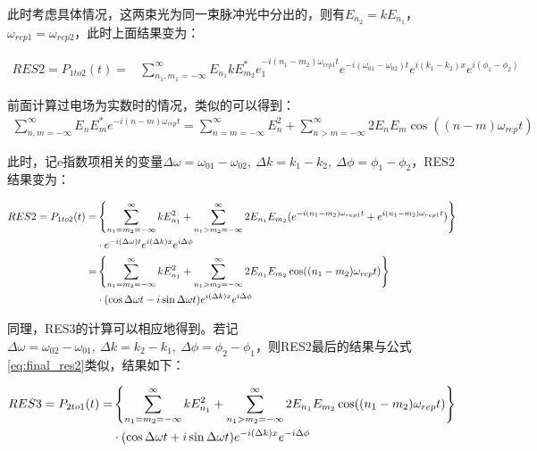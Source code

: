 此时考虑具体情况，这两束光为同一束脉冲光中分出的，则有$E_{n_2}=kE_{n_1}$，$\omega_{rep1}=\omega_{rep2}$，此时上面结果变为：
\begin{footnotesize}
\begin{align}
    RES2=P_{1to2}(t)=&\sum_{n_1,m_1=-\infty}^{\infty}E_{n_1}kE_{m_2}^*e_1^{-i(n_1-m_2)\omega_{rep1}t}e^{-i(\omega_{01}-\omega_{02})t}e^{i(k_1-k_2)x}e^{i(\phi_1-\phi_2)}
\end{align}
\end{footnotesize}

前面计算过电场为实数时的情况，类似的可以得到：
\begin{align}
    \sum_{n,m=-\infty}^{\infty}E_nE_m^*e^{-i(n-m)\omega_{rep}t}=\sum_{n=m=-\infty}^{\infty}E_n^2+\sum_{n>m=-\infty}^{\infty}2E_nE_m\cos((n-m)\omega_{rep}t)
\end{align}

此时，记e指数项相关的变量$\Delta\omega=\omega_{01}-\omega_{02},\ \Delta k=k_1-k_2,\ \Delta\phi=\phi_1-\phi_2$，RES2结果变为：
\begin{footnotesize}
\begin{align}
    RES2=P_{1to2}(t)=&\left\{\sum_{n_1=m_2=-\infty}^{\infty}kE_{n_1}^2+\sum_{n_1>m_2=-\infty}^{\infty}2E_{n_1}E_{m_2}(e^{-i(n_1-m_2)\omega_{rep1}t}+e^{i(n_1-m_2)\omega_{rep1}t})\right\}\\
    & \cdot e^{-i(\Delta\omega)t}e^{i(\Delta k)x}e^{i\Delta\phi}\\
    =&\left\{\sum_{n_1=m_2=-\infty}^{\infty}kE_{n_1}^2+\sum_{n_1>m_2=-\infty}^{\infty}2E_{n_1}E_{m_2}\cos((n_1-m_2)\omega_{rep}t)\right\}\notag\\
    & \cdot (\cos\Delta\omega t-i\sin\Delta\omega t)e^{i(\Delta k)x}e^{i\Delta\phi}\label{eq:final_res2}
\end{align}
\end{footnotesize}

同理，RES3的计算可以相应地得到。若记$\Delta\omega=\omega_{02}-\omega_{01},\ \Delta k=k_2-k_1,\ \Delta\phi=\phi_2-\phi_1$，则RES2最后的结果与公式\eqref{eq:final_res2}类似，结果如下：
\begin{small}
\begin{align}
    RES3=P_{2to1}(t)=&\left\{\sum_{n_1=m_2=-\infty}^{\infty}kE_{n_1}^2+\sum_{n_1>m_2=-\infty}^{\infty}2E_{n_1}E_{m_2}\cos((n_1-m_2)\omega_{rep}t)\right\}\notag\\
    & \cdot (\cos\Delta\omega t+i\sin\Delta\omega t)e^{-i(\Delta k)x}e^{-i\Delta\phi}\label{eq:final_res3}
\end{align}    
\end{small}

